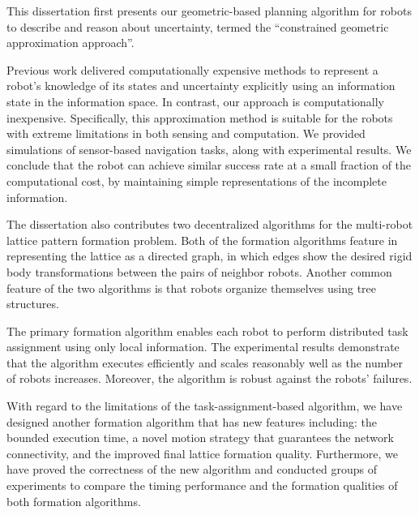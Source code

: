 This dissertation first presents our geometric-based planning algorithm
for robots to describe and reason about
uncertainty, termed the ``constrained geometric approximation approach''.

Previous work delivered computationally expensive methods to represent a robot's
knowledge of its states and uncertainty explicitly using an information state in
the information space. 
%
In contrast, our approach is computationally inexpensive.
Specifically, this approximation method is suitable for the robots 
with extreme limitations in both sensing and computation. 
%
We provided simulations of sensor-based navigation
tasks, along with experimental results.
%
We conclude that the robot can achieve similar success rate at a small fraction of the computational cost,
by maintaining simple representations of the incomplete information.
  
The dissertation also contributes two decentralized algorithms for the multi-robot
lattice pattern formation problem. 
%
Both of the formation algorithms feature in representing the lattice as
a directed graph, in which edges show the desired rigid body transformations
between the pairs of neighbor robots. 
%
Another common feature of the two algorithms is that robots organize themselves using tree structures. 

The primary formation algorithm enables each robot to perform distributed task assignment using
only local information.
%
The experimental results demonstrate that the algorithm executes efficiently and 
scales reasonably well as the number of robots increases.
Moreover, the algorithm is robust against the robots' failures.


With regard to the limitations of the task-assignment-based algorithm, 
we have designed another formation algorithm that has new features including:
the bounded execution time, a novel motion strategy that guarantees the network connectivity, 
and the improved final lattice formation quality.
%
Furthermore, we have proved the correctness of the new algorithm and 
conducted groups of experiments to compare the timing performance 
and the formation qualities of both formation algorithms.
